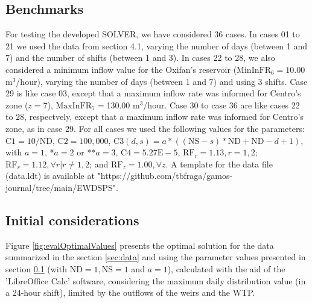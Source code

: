 \documentclass{singlecol}
\theoremstyle{TH}{
\newtheorem{lemma}{Lemma}
\newtheorem{theorem}[lemma]{Theorem}
\newtheorem{corrolary}[lemma]{Corrolary}
\newtheorem{conjecture}[lemma]{Conjecture}
\newtheorem{proposition}[lemma]{Proposition}
\newtheorem{claim}[lemma]{Claim}
\newtheorem{stheorem}[lemma]{Wrong Theorem}
\newtheorem{algorithm}{Algorithm}
}
\theoremstyle{THrm}{
\newtheorem{definition}{Definition}[section]
\newtheorem{question}{Question}[section]
\newtheorem{remark}{Remark}
\newtheorem{scheme}{Scheme}
}
\theoremstyle{THhit}{
\newtheorem{case}{Case}[section]
}
\begin{document}
\subsection{Benchmarks}
\label{sec:benchmarks}

For testing the developed SOLVER, we have considered 36 cases. In cases 01 to 21 we used the data from section 4.1, varying the number of days (between 1 and 7) and the number of shifts (between 1 and 3). In cases 22 to 28, we also considered a minimum inflow value for the Oxifan's reservoir ($\mathrm{MinInFR}_6 = 10.00$ m$^3$/hour), varying the number of days (between 1 and 7) and using 3 shifts. Case 29 is like case 03, except that a maximum inflow rate was informed for Centro's zone ($z = 7$), $\mathrm{MaxInFR}_7 = $130.00 $\mathrm{m^3}$/hour. Case 30 to case 36 are like cases 22 to 28, respectvely, except that a maximum inflow rate was informed for Centro's zone, as in case 29. For all cases we used the following values for the parameters: $\mathrm{C1}= 10/\mathrm{ND}$, $\mathrm{C2}= 100,000$, $\mathrm{C3}(d,s)=a*((\mathrm{NS}-s)*\mathrm{ND} + \mathrm{ND} - d + 1)$, with $a=1$, *$a=2$ or **$a=3$, $\mathrm{C4} = 5.27\mathrm{E-}5$, $\mathrm{RF}_r = 1.13, r=1,2$;  $\mathrm{RF}_r = 1.12,  \forall r | r \neq 1,2$; and $\mathrm{RF}_z =1.00, \forall z$. A template for the data file (data.ldt) is available at "https://github.com/tbfraga/gamos-journal/tree/main/EWDSPS".

\subsection{Initial considerations}
\label{sec:initialConsiderations}

Figure \ref{fig:evalOptimalValues} presents the optimal solution for the data summarized in the section \ref{sec:data} and using the parameter values presented in section \ref{sec:benchmarks} (with $\mathrm{ND}=1, \mathrm{NS}=1$ and $a=1$), calculated with the aid of the 'LibreOffice Calc' software, considering the maximum daily distribution value (in a 24-hour shift), limited by the outflows of the weirs and the WTP.
\end{document}
